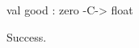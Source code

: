 \runverbatimtrue
{}
\begin{RunVerbatimMsg}
val good : zero -C-> float
\end{RunVerbatimMsg}
\begin{RunVerbatimErr}
Success.
\end{RunVerbatimErr}
